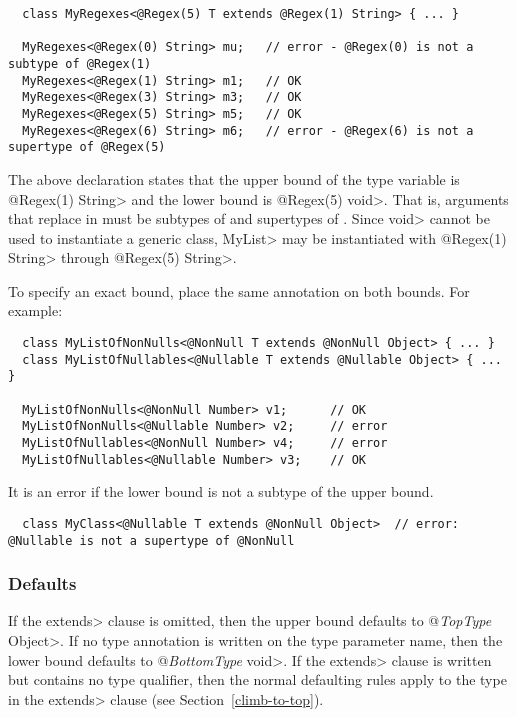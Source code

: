 \begin{Verbatim}
  class MyRegexes<@Regex(5) T extends @Regex(1) String> { ... }

  MyRegexes<@Regex(0) String> mu;   // error - @Regex(0) is not a subtype of @Regex(1)
  MyRegexes<@Regex(1) String> m1;   // OK
  MyRegexes<@Regex(3) String> m3;   // OK
  MyRegexes<@Regex(5) String> m5;   // OK
  MyRegexes<@Regex(6) String> m6;   // error - @Regex(6) is not a supertype of @Regex(5)
\end{Verbatim}

The above declaration states that the upper bound of the type variable
is \<@Regex(1) String> and the lower bound is \<@Regex(5) void>.  That is,
arguments that replace  in  must be subtypes of
 and supertypes of .
Since \<void> cannot be used to instantiate a generic class, \<MyList> may
be instantiated with \<@Regex(1) String> through \<@Regex(5) String>.


To specify an exact bound, place the same annotation on both bounds.  For example:

\begin{Verbatim}
  class MyListOfNonNulls<@NonNull T extends @NonNull Object> { ... }
  class MyListOfNullables<@Nullable T extends @Nullable Object> { ... }

  MyListOfNonNulls<@NonNull Number> v1;      // OK
  MyListOfNonNulls<@Nullable Number> v2;     // error
  MyListOfNullables<@NonNull Number> v4;     // error
  MyListOfNullables<@Nullable Number> v3;    // OK
\end{Verbatim}

It is an error if the lower bound is not a subtype of the upper bound.

\begin{smaller}
\begin{Verbatim}
  class MyClass<@Nullable T extends @NonNull Object>  // error: @Nullable is not a supertype of @NonNull
\end{Verbatim}
\end{smaller}


\subsubsection{Defaults\label{generics-defaults}}
If the \<extends> clause is omitted,
then the upper bound defaults to \<@\emph{TopType} Object>.
If no type annotation is written on the type parameter name,
then the lower bound defaults to \<@\emph{BottomType} void>.
If the \<extends> clause is written but contains no type qualifier,
then the normal defaulting rules apply to the type in the \<extends>
clause (see Section~\ref{climb-to-top}).

